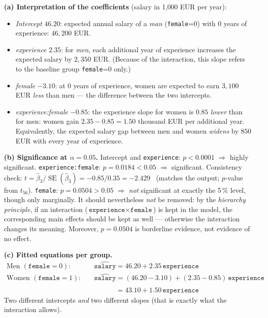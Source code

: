 \documentclass[11pt,a4paper]{article}
\begin{document}
\ifdefined\withsolutions
\begin{solutionbox}
\textbf{(a) Interpretation of the coefficients} (salary in 1{,}000 EUR per year):
\begin{itemize}[nosep,leftmargin=5mm]
  \item \emph{Intercept} $46.20$: expected annual salary of a \emph{man}
    (\texttt{female}=0) with 0 years of experience: $46{,}200$ EUR.
  \item \emph{experience} $2.35$: for \emph{men}, each additional year of experience increases
    the expected salary by $2{,}350$ EUR. (Because of the interaction, this slope refers to the
    baseline group \texttt{female}=0 only.)
  \item \emph{female} $-3.10$: at 0 years of experience, women are expected to earn
    $3{,}100$ EUR \emph{less} than men --- the difference between the two intercepts.
  \item \emph{experience:female} $-0.85$: the experience slope for women is $0.85$ \emph{lower}
    than for men: women gain $2.35-0.85=1.50$ thousand EUR per additional year. Equivalently,
    the expected salary gap between men and women \emph{widens} by $850$ EUR with every year
    of experience.
\end{itemize}

\medskip
\textbf{(b) Significance at $\alpha=0.05$.}
Intercept and \texttt{experience}: $p<0.0001$ $\Rightarrow$ highly significant.
\texttt{experience:female}: $p=0.0184<0.05$ $\Rightarrow$ significant.
Consistency check: $t=\hat{\beta}_3/\operatorname{SE}(\hat{\beta}_3)=-0.85/0.35=-2.429$
\checkmark\ (matches the output; $p$-value from $t_{56}$).
\texttt{female}: $p=0.0504>0.05$ $\Rightarrow$ \emph{not} significant at exactly the 5\,\%
level, though only marginally. It should nevertheless \emph{not} be removed: by the
\emph{hierarchy principle}, if an interaction ($\texttt{experience}\times\texttt{female}$) is
kept in the model, the corresponding main effects should be kept as well --- otherwise the
interaction changes its meaning. Moreover, $p=0.0504$ is borderline evidence, not evidence of
no effect.

\medskip
\textbf{(c) Fitted equations per group.}
\begin{align*}
\text{Men } (\texttt{female}=0):\quad & \widehat{\texttt{salary}} = 46.20 + 2.35\,\texttt{experience}\\
\text{Women } (\texttt{female}=1):\quad & \widehat{\texttt{salary}} = (46.20-3.10) + (2.35-0.85)\,\texttt{experience}\\
 & \phantom{\widehat{\texttt{salary}}} = 43.10 + 1.50\,\texttt{experience}
\end{align*}
Two different intercepts \emph{and} two different slopes (that is exactly what the interaction allows).


\end{solutionbox}
\end{document}
